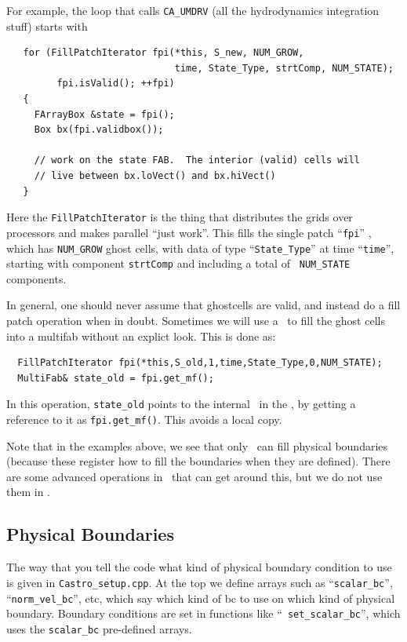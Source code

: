 \begin{itemize}
  For example, the loop that calls {\tt CA\_UMDRV} (all the
  hydrodynamics integration stuff) starts with
\begin{lstlisting}
   for (FillPatchIterator fpi(*this, S_new, NUM_GROW,
                              time, State_Type, strtComp, NUM_STATE);
         fpi.isValid(); ++fpi)
   {
     FArrayBox &state = fpi();
     Box bx(fpi.validbox());

     // work on the state FAB.  The interior (valid) cells will 
     // live between bx.loVect() and bx.hiVect()
   }
\end{lstlisting}
Here the {\tt FillPatchIterator} is the thing that distributes the
grids over processors and makes parallel ``just work''. This fills the
single patch ``{\tt fpi}'' , which has {\tt NUM\_GROW} ghost cells,
with data of type ``{\tt State\_Type}'' at time ``{\tt time}'',
starting with component {\tt strtComp} and including a total of {\tt
  NUM\_STATE} components. 

\end{itemize}

In general, one should never assume that ghostcells are valid, and
instead do a fill patch operation when in doubt.  Sometimes we will
use a \fillpatchiterator\ to fill the ghost cells into a multifab
without an explict look.  This is done as:
\begin{lstlisting}
  FillPatchIterator fpi(*this,S_old,1,time,State_Type,0,NUM_STATE);
  MultiFab& state_old = fpi.get_mf();     
\end{lstlisting}
In this operation, {\tt state\_old} points to the internal
\multifab\ in the \fillpatchiterator, by getting a reference to it as
              {\tt fpi.get\_mf()}.  This avoids a local copy.

Note that in the examples above, we see that only \statedata\ can fill
physical boundaries (because these register how to fill the boundaries
when they are defined).  There are some advanced operations in
\boxlib\ that can get around this, but we do not use them in \castro.  

\subsection{Physical Boundaries}

The way that you tell the code what kind of physical boundary
condition to use is given in {\tt Castro\_setup.cpp}. At the top we
define arrays such as ``{\tt scalar\_bc}'', ``{\tt norm\_vel\_bc}'',
etc, which say which kind of bc to use on which kind of physical
boundary.  Boundary conditions are set in functions like ``{\tt
  set\_scalar\_bc}'', which uses the {\tt scalar\_bc} pre-defined
arrays.

